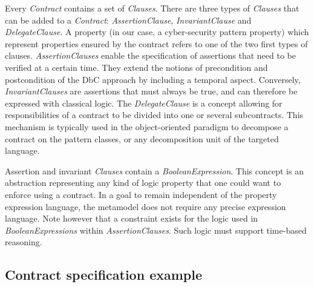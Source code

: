 Every \textit{Contract} contains a set of \emph{Clauses}. There are three types of \textit{Clauses} that can be added to a \textit{Contract}: \textit{AssertionClause}, \textit{InvariantClause} and \textit{DelegateClause}. A property (in our case, a cyber-security pattern property) which represent properties ensured by the contract refers to one of the two first types of clauses. \textit{AssertionClauses} enable the specification of assertions that need to be verified at a certain time. They extend the notions of precondition and postcondition of the DbC approach by including a temporal aspect. Conversely, \textit{InvariantClauses} are assertions that must always be true, and can therefore be expressed with classical logic. The \textit{DelegateClause} is a concept allowing for responsibilities of a contract to be divided into one or several subcontracts. This mechanism is typically used in the object-oriented paradigm to decompose a contract on the pattern classes, or any decomposition unit of the targeted language.

Assertion and invariant \emph{Clauses} contain a \textit{BooleanExpression}. This concept is an abstraction representing any kind of logic property that one could want to enforce using a contract. In a goal to remain independent of the property expression language, the metamodel does not require any precise expression language. Note however that a constraint exists for the logic used in \textit{BooleanExpressions} within \textit{AssertionClauses}. Such logic must support time-based reasoning.

 


\subsection{Contract specification example}
\label{subsection:secureapplication}

